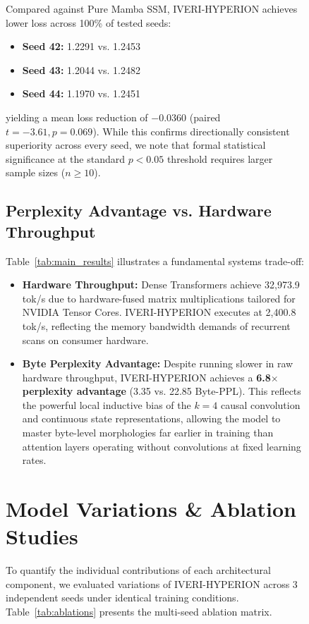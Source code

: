 \documentclass[10pt,twocolumn,letterpaper]{article}
\begin{document}
\begin{figure}[t]
Compared against Pure Mamba SSM, IVERI-HYPERION achieves lower loss across 100\% of tested seeds:
\begin{itemize}[leftmargin=*]
    \item \textbf{Seed 42:} 1.2291 vs. 1.2453
    \item \textbf{Seed 43:} 1.2044 vs. 1.2482
    \item \textbf{Seed 44:} 1.1970 vs. 1.2451
\end{itemize}
yielding a mean loss reduction of $-0.0360$ (paired $t = -3.61, p = 0.069$). While this confirms directionally consistent superiority across every seed, we note that formal statistical significance at the standard $p < 0.05$ threshold requires larger sample sizes ($n \ge 10$).

\subsection{Perplexity Advantage vs. Hardware Throughput}
Table~\ref{tab:main_results} illustrates a fundamental systems trade-off:
\begin{itemize}[leftmargin=*]
    \item \textbf{Hardware Throughput:} Dense Transformers achieve 32,973.9 tok/s due to hardware-fused matrix multiplications tailored for NVIDIA Tensor Cores. IVERI-HYPERION executes at 2,400.8 tok/s, reflecting the memory bandwidth demands of recurrent scans on consumer hardware.
    \item \textbf{Byte Perplexity Advantage:} Despite running slower in raw hardware throughput, IVERI-HYPERION achieves a \textbf{6.8$\times$ perplexity advantage} (3.35 vs. 22.85 Byte-PPL). This reflects the powerful local inductive bias of the $k=4$ causal convolution and continuous state representations, allowing the model to master byte-level morphologies far earlier in training than attention layers operating without convolutions at fixed learning rates.
\end{itemize}

\section{Model Variations \& Ablation Studies}
\label{sec:ablations}

To quantify the individual contributions of each architectural component, we evaluated variations of IVERI-HYPERION across 3 independent seeds under identical training conditions. Table~\ref{tab:ablations} presents the multi-seed ablation matrix.


\end{figure}
\end{document}
